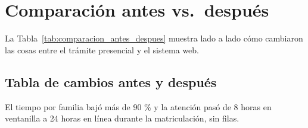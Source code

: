 \section{Comparación antes vs.~después}
\label{sec:comparacion_antes_despues}

La Tabla~\ref{tab:comparacion_antes_despues} muestra lado a lado cómo cambiaron las cosas entre el trámite presencial y el sistema web.

\subsection{Tabla de cambios antes y después}
\label{sec:tabla_cambios}



El tiempo por familia bajó más de 90 \% y la atención pasó de 8 horas en ventanilla a 24 horas en línea durante la matriculación, sin filas.
